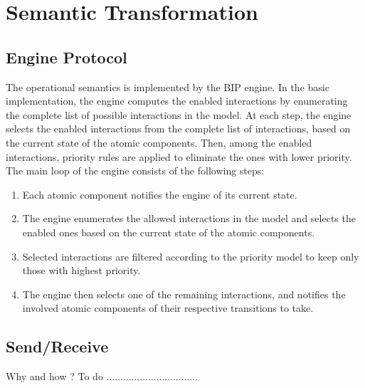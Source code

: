 \section{Semantic Transformation}
\label{section:semantics}


\subsection{Engine Protocol}  \label{sec:enumprotocol}
The operational semantics is implemented by the BIP engine. In the basic implementation, the engine computes the enabled interactions by enumerating the complete list of possible interactions in the model. At each step, the engine selects the enabled interactions from the complete list of interactions, based on the current state of the atomic components. Then, among the enabled interactions, priority rules are applied to eliminate the ones with lower priority.\\
The main loop of the engine consists of the following steps:
\begin{enumerate}
\item Each atomic component notifies the engine of its current state.
\item The engine enumerates the allowed interactions in the model and selects the enabled ones based on the current state of the atomic components.
\item Selected interactions are filtered according to the priority model to keep only those with highest priority.
\item The engine then selects one of the remaining interactions, and notifies the involved atomic components of their respective transitions to take.
\end{enumerate}

 
\subsection{Send/Receive}
Why and how ? To do .................................
